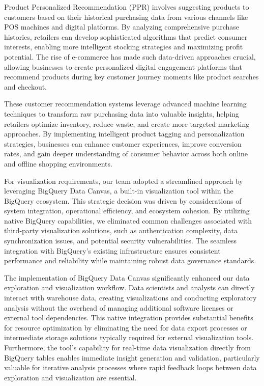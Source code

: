 Product Personalized Recommendation (PPR) involves suggesting products to customers based on their
historical purchasing data from various channels like POS machines and digital platforms. By
analyzing comprehensive purchase histories, retailers can develop sophisticated algorithms that
predict consumer interests, enabling more intelligent stocking strategies and maximizing profit
potential. The rise of e-commerce has made such data-driven approaches crucial, allowing businesses
to create personalized digital engagement platforms that recommend products during key customer
journey moments like product searches and checkout.

These customer recommendation systems leverage advanced machine learning techniques to transform raw
purchasing data into valuable insights, helping retailers optimize inventory, reduce waste, and
create more targeted marketing approaches. By implementing intelligent product tagging and
personalization strategies, businesses can enhance customer experiences, improve conversion rates,
and gain deeper understanding of consumer behavior across both online and offline shopping
environments.

For visualization requirements, our team adopted a streamlined approach by leveraging BigQuery Data
Canvas, a built-in visualization tool within the BigQuery ecosystem. This strategic decision was
driven by considerations of system integration, operational efficiency, and ecosystem cohesion. By
utilizing native BigQuery capabilities, we eliminated common challenges associated with third-party
visualization solutions, such as authentication complexity, data synchronization issues, and
potential security vulnerabilities. The seamless integration with BigQuery's existing infrastructure
ensures consistent performance and reliability while maintaining robust data governance standards.

The implementation of BigQuery Data Canvas significantly enhanced our data exploration and
visualization workflow. Data scientists and analysts can directly interact with warehouse data,
creating visualizations and conducting exploratory analysis without the overhead of managing
additional software licenses or external tool dependencies. This native integration provides
substantial benefits for resource optimization by eliminating the need for data export processes or
intermediate storage solutions typically required for external visualization tools. Furthermore, the
tool's capability for real-time data visualization directly from BigQuery tables enables immediate
insight generation and validation, particularly valuable for iterative analysis processes where
rapid feedback loops between data exploration and visualization are essential.